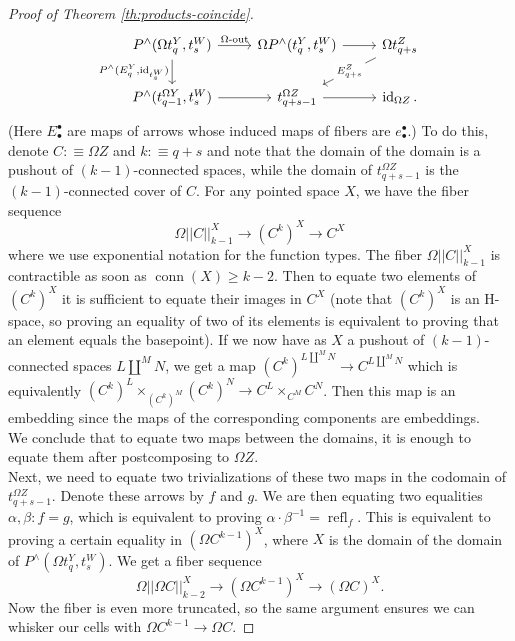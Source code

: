 \documentclass{amsart}
\theoremstyle{definition}
\newcommand{\id}{\operatorname{id}}
\newcommand{\refl}{\operatorname{refl}}
\newcommand{\oout}{\operatorname{\Omega-out}}
\begin{document}
\begin{proof}[Proof of Theorem \ref{th:products-coincide}]
    \[\begin{tikzcd}
    	{P^\wedge(\Omega t_q^Y, t_s^W)} & {\Omega P^\wedge(t_q^Y, t_s^W)} & {\Omega t^Z_{q+s}} \\
    	{P^\wedge(t_{q-1}^{\Omega Y}, t_s^W)} & {t^{\Omega Z}_{q+s-1}} & {\id_{\Omega Z}.}
    	\arrow["\oout", from=1-1, to=1-2]
    	\arrow["{P^\wedge({E}^Y_{q}, \operatorname{id}_{t^W_s})}"', from=1-1, to=2-1]
    	\arrow[from=1-2, to=1-3]
    	\arrow["{{E}^Z_{q+s}}"{description}, from=1-3, to=2-2]
    	\arrow[from=2-1, to=2-2]
    	\arrow[from=2-2, to=2-3]
    \end{tikzcd}\]
    (Here $E^\bullet_\bullet$ are maps of arrows whose induced maps of fibers are $e^\bullet_\bullet$.) To do this, denote $C: \equiv \Omega Z $ and $k:\equiv q+s$ and note that the domain of the domain is a pushout of $(k-1)$-connected spaces, while the domain of $t^{\Omega Z}_{q+s-1}$ is the $(k-1)$-connected cover of $C$. For any pointed space $X$, we have the fiber sequence
    $$\Omega||C||_{{k-1}}^X \to (C^{k})^X \to C^X$$
    where we use exponential notation for the function types. The fiber $\Omega||C||_{{k}-1}^X$ is contractible as soon as $\operatorname{conn}(X) \geq k-2$. Then to equate two elements of $(C^{k})^X$ it is sufficient to equate their images in $C^X$ (note that $(C^{k})^X$ is an H-space, so proving an equality of two of its elements is equivalent to proving that an element equals the basepoint). If we now have as $X$ a pushout of $(k-1)$-connected spaces $L \coprod^M N$, we get a map $(C^k)^{L \coprod^M N} \to C^{L \coprod^M N}$ which is equivalently ${(C^k)}^L \times_{{(C^k)^M}} (C^k)^N \to {C}^L \times_{{C^M}} C^N $. Then this map is an embedding since the maps of the corresponding components are embeddings.
    \\
    We conclude that to equate two maps between the domains, it is enough to equate them after postcomposing to $\Omega Z$.
    \\
    Next, we need to equate two trivializations of these two maps in the codomain of $t^{\Omega Z}_{q+s-1}$. Denote these arrows by $f$ and $g$. We are then equating two equalities $\alpha, \beta : f = g$, which is equivalent to proving $\alpha \cdot \beta^{-1} = \refl_{f}$. This is equivalent to proving a certain equality in $(\Omega C^{k-1})^{X}$, where $X$ is the domain of the domain of $P^\wedge(\Omega t_q^Y, t_s^W)$.
    We get a fiber sequence
    $$\Omega||\Omega C||_{{k-2}}^X \to (\Omega C^{k-1})^X \to (\Omega C)^X.$$
    Now the fiber is even more truncated, so the same argument ensures we can whisker our cells with $\Omega C^{k-1} \to \Omega C$.


\end{proof}
\end{document}
